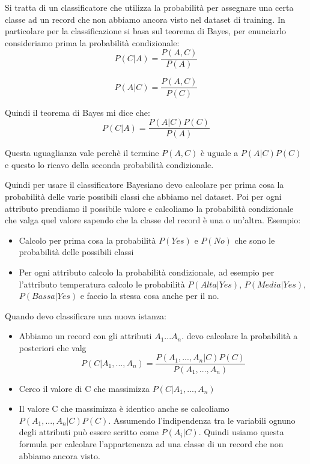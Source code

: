 \documentclass[14pt]{extreport}
\begin{document}
Si tratta di un classificatore che utilizza la probabilità per assegnare una certa classe ad un record che non abbiamo ancora visto nel dataset di training.
In particolare per la classificazione si basa sul teorema di Bayes, per enunciarlo consideriamo prima la probabilità condizionale:
\begin{equation}
    P(C|A) = \frac{P(A,C)}{P(A)}    
\end{equation}

\begin{equation}
    P(A|C) = \frac{P(A,C)}{P(C)}
\end{equation}

Quindi il teorema di Bayes mi dice che:
\begin{equation}
    P(C|A) = \frac{P(A|C)P(C)}{P(A)}
\end{equation}

Questa uguaglianza vale perchè il termine $P(A,C)$ è uguale a $P(A|C)P(C)$ e questo lo ricavo della seconda probabilità condizionale.

Quindi per usare il classificatore Bayesiano devo calcolare per prima cosa la probabilità delle varie possibili classi che abbiamo nel dataset. Poi per ogni attributo prendiamo il possibile valore e calcoliamo la probabilità condizionale che valga quel valore sapendo che la classe del record è una o un'altra.
Esempio:
\begin{itemize}
    \item Calcolo per prima cosa la probabilità $P(Yes)$ e $P(No)$ che sono le probabilità delle possibili classi
    \item Per ogni attributo calcolo la probabilità condizionale, ad esempio per l'attributo temperatura calcolo le probabilità $P(Alta|Yes)$, $P(Media|Yes)$, $P(Bassa|Yes)$ e faccio la stessa cosa anche per il no.
\end{itemize}

Quando devo classificare una nuova istanza:

\begin{itemize}
    \item Abbiamo un record con gli attributi $A_1...A_n$. devo calcolare la probabilità a posteriori che valg
    \begin{equation}
        P(C|A_1,...,A_n) = \frac{P(A_1,...,A_n|C)P(C)}{P(A_1,...,A_n)}
    \end{equation}
    \item Cerco il valore di C che massimizza $P(C|A_1,...,A_n)$
    \item Il valore C che massimizza è identico anche se calcoliamo $P(A_1,...,A_n|C)P(C)$. Assumendo l'indipendenza tra le variabili ognuno degli attributi può essere scritto come $P(A_i|C)$. Quindi usiamo questa formula per calcolare l'appartenenza ad una classe di un record che non abbiamo ancora visto.
\end{itemize}
\end{document}
